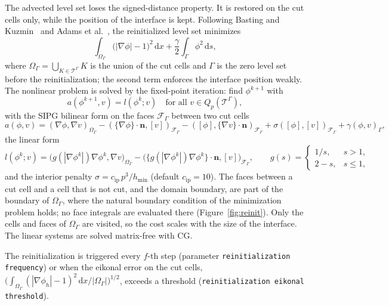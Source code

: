 \documentclass[11pt,a4paper]{article}
\newcommand{\T}{\mathcal{T}}
\newcommand{\nn}{\bm{n}}
\newcommand{\dd}{\,\mathrm{d}}
\begin{document}
The advected level set loses the signed-distance property. It is restored on the cut cells only,
while the position of the interface is kept. Following Basting and Kuzmin~\cite{BastingKuzmin2013}
and Adams et al.~\cite{Adams2019}, the reinitialized level set minimizes
\begin{equation}
\int_{\Omega_\Gamma} \big(|\nabla\phi| - 1\big)^2 \dd x
+ \frac{\gamma}{2} \int_{\Gamma} \phi^2 \dd s,
\end{equation}
where $\Omega_\Gamma = \bigcup_{K \in \T^{\Gamma}} K$ is the union of the cut cells and $\Gamma$ is
the zero level set before the reinitialization; the second term enforces the interface position
weakly. The nonlinear problem is solved by the fixed-point iteration: find $\phi^{k+1}$ with
\begin{equation}
a(\phi^{k+1}, v) = l(\phi^k; v) \quad \text{for all } v \in Q_p(\T^{\Gamma}),
\end{equation}
with the SIPG bilinear form on the faces $\mathcal{F}_\Gamma$ between two cut cells
\begin{equation}
a(\phi, v) = (\nabla\phi, \nabla v)_{\Omega_\Gamma}
- (\{\nabla\phi\}\cdot\nn, [v])_{\mathcal{F}_\Gamma}
- ([\phi], \{\nabla v\}\cdot\nn)_{\mathcal{F}_\Gamma}
+ \sigma ([\phi], [v])_{\mathcal{F}_\Gamma}
+ \gamma (\phi, v)_{\Gamma},
\end{equation}
the linear form
\begin{equation}
l(\phi^k; v) = \big(g(|\nabla\phi^k|)\nabla\phi^k, \nabla v\big)_{\Omega_\Gamma}
- \big(\{g(|\nabla\phi^k|)\nabla\phi^k\}\cdot\nn, [v]\big)_{\mathcal{F}_\Gamma},
\qquad
g(s) = \begin{cases} 1/s, & s > 1,\\ 2 - s, & s \le 1,\end{cases}
\end{equation}
and the interior penalty $\sigma = c_{\mathrm{ip}}\, p^3 / h_{\min}$ (default $c_{\mathrm{ip}} = 10$).
The faces between a cut cell and a cell that is not cut, and the domain boundary, are part of the
boundary of $\Omega_\Gamma$, where the natural boundary condition of the minimization problem holds;
no face integrals are evaluated there (Figure~\ref{fig:reinit}). Only the cells and faces of
$\Omega_\Gamma$ are visited, so the cost scales with the size of the interface. The linear systems
are solved matrix-free with CG.

The reinitialization is triggered every $f$-th step (parameter \texttt{reinitialization frequency})
or when the eikonal error on the cut cells,
$\big(\int_{\Omega_\Gamma}(|\nabla\phi_h|-1)^2\dd x / |\Omega_\Gamma|\big)^{1/2}$, exceeds a
threshold (\texttt{reinitialization eikonal threshold}).
\end{document}
